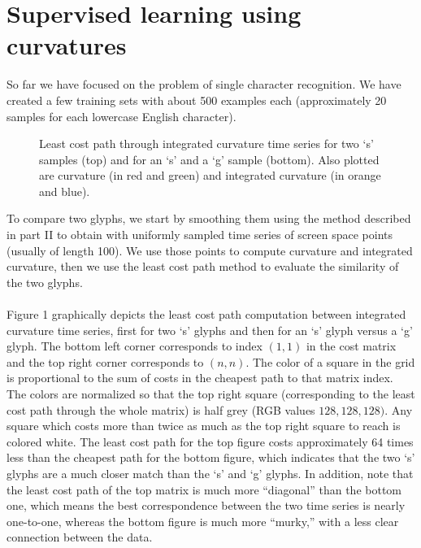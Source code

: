 \documentclass[journal]{IEEEtran}
\begin{document}
\section{Supervised learning using curvatures}
So far we have focused on the problem of single character recognition. We have created a few training sets with about 500 examples each (approximately 20 samples for each lowercase English character). 
\begin{figure}[H]
\hfill
{}
\centering
\caption{Least cost path through integrated curvature time series for two `s' samples (top) and for an `s' and a `g' sample (bottom). Also plotted are curvature (in red and green) and integrated curvature (in orange and blue).}
\end{figure}
To compare two glyphs, we start by smoothing them using the method described in part II to obtain with uniformly sampled time series of screen space points (usually of length 100). We use those points to compute curvature and integrated curvature, then we use the least cost path method to evaluate the similarity of the two glyphs.\\\\
Figure 1 graphically depicts the least cost path computation between integrated curvature time series, first for two `s' glyphs and then for an `s' glyph versus a `g' glyph. The bottom left corner corresponds to index $(1,1)$ in the cost matrix and the top right corner corresponds to $(n,n)$. The color of a square in the grid is proportional to the sum of costs in the cheapest path to that matrix index. The colors are normalized so that the top right square (corresponding to the least cost path through the whole matrix) is half grey (RGB values $128,128,128)$. Any square which costs more than twice as much as the top right square to reach is colored white. The least cost path for the top figure costs approximately 64 times less than the cheapest path for the bottom figure, which indicates that the two `s' glyphs are a much closer match than the `s' and `g' glyphs. In addition, note that the least cost path of the top matrix is much more ``diagonal'' than the bottom one, which means the best correspondence between the two time series is nearly one-to-one, whereas the bottom figure is much more ``murky,'' with a less clear connection between the data.\\\\
\end{document}
